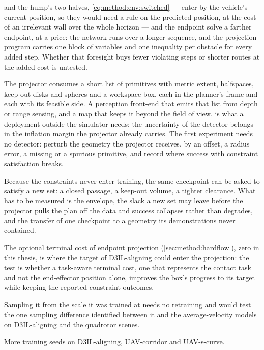 \begin{description}
    and the hump's two halves, \eqref{eq:method:env:switched} --- enter by the vehicle's current position, so they
    would need a rule on the predicted position, at the cost of an irrelevant wall over the whole horizon --- and
    the endpoint solve a
    farther endpoint, at a price: the
    network runs over a longer sequence, and the projection program carries one block of variables and
    one inequality per obstacle for every added step. Whether that foresight buys fewer violating
    steps or shorter routes at the added cost is untested.
  \item[Constraints from perception.] The projector consumes a short list of primitives with metric
    extent, halfspaces, keep-out disks and spheres and a workspace box, each in the planner's frame and
    each with its feasible side. A perception front-end that emits that list from depth or range
    sensing, and a map that keeps it beyond the field of view, is what a deployment outside the
    simulator needs; the uncertainty of the detector belongs in the inflation margin the projector
    already carries. The first experiment needs no detector: perturb the geometry the projector
    receives, by an offset, a radius error, a missing or a spurious primitive, and record where success
    with constraint satisfaction breaks.
  \item[Re-tasking at deployment.] Because the constraints never enter training, the same checkpoint
    can be asked to satisfy a new set: a closed passage, a keep-out volume, a tighter clearance. What
    has to be measured is the envelope, the slack a new set may leave before the projector pulls the
    plan off the data and success collapses rather than degrades, and the transfer of one checkpoint to
    a geometry its demonstrations never contained.
  \item[The alignment target.] The optional terminal cost of endpoint projection
    (\autoref{sec:method:hardflow}), zero in this thesis, is where the target of D3IL-aligning could
    enter the projection: the test is whether a task-aware terminal cost, one that represents the
    contact task and not the end-effector position alone, improves the box's progress to its target
    while keeping the reported constraint outcomes.
  \item[The sampler of instantaneous-velocity matching.] Sampling it from the scale it was trained at
    needs no retraining and would test the one sampling difference identified between it and the
    average-velocity models on D3IL-aligning and the quadrotor scenes.  \item[Seeds.] More training seeds on D3IL-aligning, UAV-corridor and UAV-s-curve.
\end{description}
